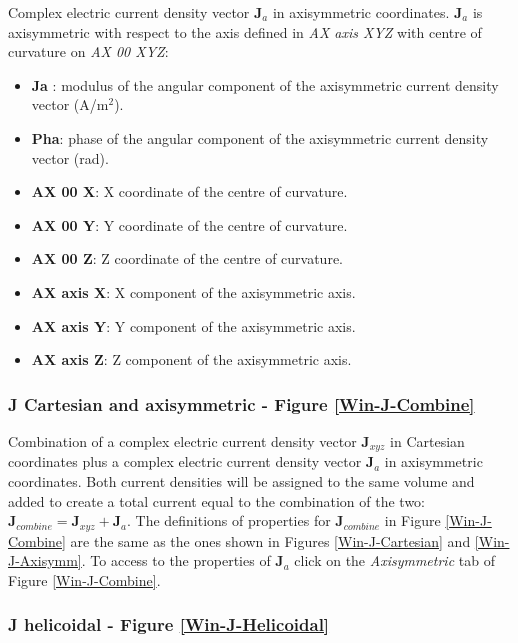 Complex electric current density vector $\textbf{J}_{a}$ in axisymmetric coordinates. $\textbf{J}_{a}$ is axisymmetric with respect to the axis defined in \emph{AX axis XYZ} with centre of curvature on \emph{AX 00 XYZ}:
\begin{itemize}\itemsep0em 
	\item \textbf{Ja }: modulus of the angular component of the axisymmetric current density vector (A/m$^{2}$). 
	\item \textbf{Pha}: phase of the angular component of the axisymmetric current density vector (rad).
	\\
	\item \textbf{AX 00 X}: X coordinate of the centre of curvature.
	\item \textbf{AX 00 Y}: Y coordinate of the centre of curvature.
	\item \textbf{AX 00 Z}: Z coordinate of the centre of curvature.
	\\
	\item \textbf{AX axis X}: X component of the axisymmetric axis.
	\item \textbf{AX axis Y}: Y component of the axisymmetric axis.
	\item \textbf{AX axis Z}: Z component of the axisymmetric axis.
\end{itemize}

\subsubsection{J Cartesian and axisymmetric - Figure \ref{Win-J-Combine}}

Combination of a complex electric current density vector $\textbf{J}_{xyz}$ in Cartesian coordinates plus a complex electric current density vector $\textbf{J}_{a}$ in axisymmetric coordinates. Both current densities will be assigned to the same volume and added to create a total current equal to the combination of the two: $\textbf{J}_{combine} = \textbf{J}_{xyz} + \textbf{J}_{a}$. The definitions of properties for $\textbf{J}_{combine}$ in Figure \ref{Win-J-Combine} are the same as the ones shown in Figures \ref{Win-J-Cartesian} and \ref{Win-J-Axisymm}. To access to the properties of $\textbf{J}_{a}$ click on the \textit{Axisymmetric} tab of Figure \ref{Win-J-Combine}.

\subsubsection{J helicoidal - Figure \ref{Win-J-Helicoidal}}

